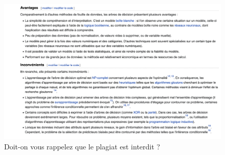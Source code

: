 \documentclass[11pt]{article}
\begin{document}
\begin{figure}[h!]
    \includegraphics{figures/plagiat.png}
    \caption{Doit-on vous rappelez que le plagiat est interdit ?}
\end{figure}
\end{document}
